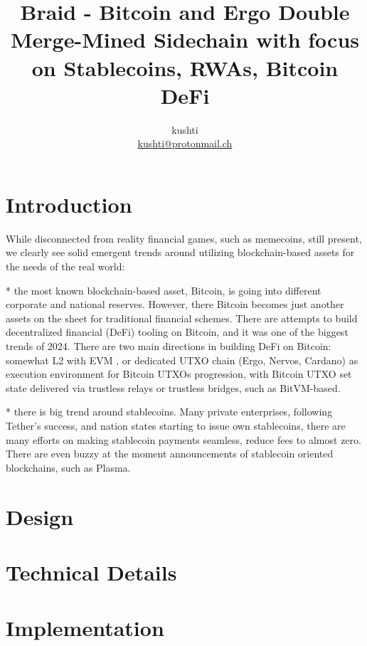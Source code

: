 \documentclass{llncs}   %
\begin{document}
\title{Braid - Bitcoin and Ergo Double Merge-Mined Sidechain with focus on Stablecoins, RWAs, Bitcoin DeFi}

\author{kushti \\ \href{mailto:kushti@protonmail.ch}{kushti@protonmail.ch}}


\maketitle

\begin{abstract}
\end{abstract}

\section{Introduction}

While disconnected from reality financial games, such as memecoins, still present, we clearly see solid emergent trends around utilizing 
blockchain-based assets for the needs of the real world:

* the most known blockchain-based asset, Bitcoin, is going into different corporate and national reserves. However, there Bitcoin becomes just another assets on the sheet for traditional financial schemes. There are attempts to build decentralized financial (DeFi) tooling on Bitcoin, and it was one of the biggest trends of 2024. There are two main directions in building DeFi on Bitcoin: somewhat L2 with EVM , or dedicated UTXO chain (Ergo, Nervos, Cardano) as execution environment for Bitcoin UTXOs progression, with Bitcoin UTXO set state delivered via trustless relays or trustless bridges, such as BitVM-based.

* there is big trend around stablecoins. Many private enterprises, following Tether's success, and nation states starting to issue own stablecoins, there are many efforts on making stablecoin payments seamless, reduce fees to almost zero. There are even buzzy at the moment 
announcements of stablecoin oriented blockchains, such as Plasma. 



\section{Design}
\label{sec-design}




\section{Technical Details}
\label{sec-impl}


\section{Implementation}
\label{sec-apps}



\newpage

 
\end{document}
